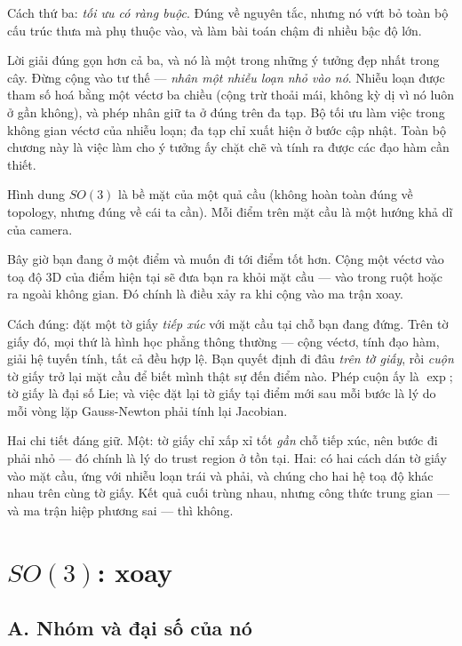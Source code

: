 \documentclass[../../vslam.tex]{subfiles}
\begin{document}
Cách thứ ba: \emph{tối ưu có ràng buộc}. Đúng về nguyên tắc, nhưng nó vứt bỏ toàn bộ cấu trúc thưa mà  phụ thuộc vào, và làm bài toán chậm đi nhiều bậc độ lớn.

Lời giải đúng gọn hơn cả ba, và nó là một trong những ý tưởng đẹp nhất trong cây. Đừng cộng vào tư thế --- \emph{nhân một nhiễu loạn nhỏ vào nó}. Nhiễu loạn được tham số hoá bằng một véctơ ba chiều (cộng trừ thoải mái, không kỳ dị vì nó luôn ở gần không), và phép nhân giữ ta ở đúng trên đa tạp. Bộ tối ưu làm việc trong không gian véctơ của nhiễu loạn; đa tạp chỉ xuất hiện ở bước cập nhật. Toàn bộ chương này là việc làm cho ý tưởng ấy chặt chẽ và tính ra được các đạo hàm cần thiết.

\begin{trucgiac}
Hình dung \(SO(3)\) là bề mặt của một quả cầu (không hoàn toàn đúng về topology, nhưng đúng về cái ta cần). Mỗi điểm trên mặt cầu là một hướng khả dĩ của camera.

Bây giờ bạn đang ở một điểm và muốn đi tới điểm tốt hơn. Cộng một véctơ vào toạ độ \(3\)D của điểm hiện tại sẽ đưa bạn ra khỏi mặt cầu --- vào trong ruột hoặc ra ngoài không gian. Đó chính là điều xảy ra khi cộng vào ma trận xoay.

Cách đúng: đặt một tờ giấy \emph{tiếp xúc} với mặt cầu tại chỗ bạn đang đứng. Trên tờ giấy đó, mọi thứ là hình học phẳng thông thường --- cộng véctơ, tính đạo hàm, giải hệ tuyến tính, tất cả đều hợp lệ. Bạn quyết định đi đâu \emph{trên tờ giấy}, rồi \emph{cuộn} tờ giấy trở lại mặt cầu để biết mình thật sự đến điểm nào. Phép cuộn ấy là \(\exp\); tờ giấy là đại số Lie; và việc đặt lại tờ giấy tại điểm mới sau mỗi bước là lý do mỗi vòng lặp Gauss-Newton phải tính lại Jacobian.

Hai chi tiết đáng giữ. Một: tờ giấy chỉ xấp xỉ tốt \emph{gần} chỗ tiếp xúc, nên bước đi phải nhỏ --- đó chính là lý do trust region ở  tồn tại. Hai: có hai cách dán tờ giấy vào mặt cầu, ứng với nhiễu loạn trái và phải, và chúng cho hai hệ toạ độ khác nhau trên cùng tờ giấy. Kết quả cuối trùng nhau, nhưng công thức trung gian --- và ma trận hiệp phương sai --- thì không.
\end{trucgiac}

\section{\(SO(3)\): xoay}

\subsection{A. Nhóm và đại số của nó}
\end{document}
